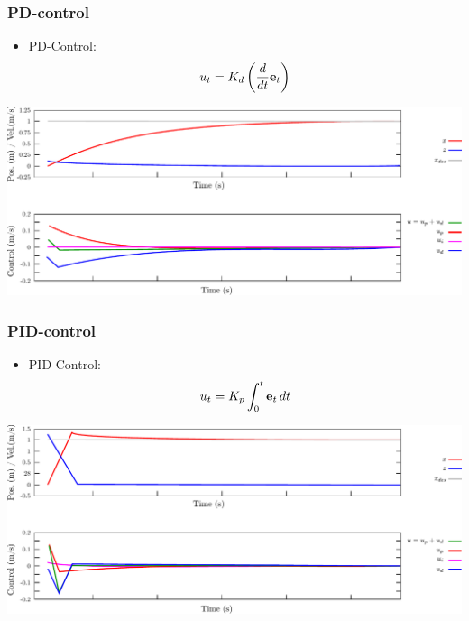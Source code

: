 \begin{frame}
    \frametitle{PD-control}
    
    \begin{itemize}
        \item PD-Control:
        \begin{equation*}
            u_{t} = K_{d} \left( \frac{d}{d t} \boldsymbol{\mathbf{e}}_{t} \right)
        \end{equation*}
    \end{itemize}
    
    \begin{center}
        \includegraphics[width=0.8\columnwidth]{images/pid_control_position_proportional_derivative.pdf}
    \end{center}
    
\end{frame}


\begin{frame}
    \frametitle{PID-control}
    
    \begin{itemize}
        \item PID-Control:
        \begin{equation*}
            u_{t} = K_{p} \int_{0}^{t} \boldsymbol{\mathbf{e}}_{t} \, dt
        \end{equation*}
    \end{itemize}
    
    \begin{center}
        \includegraphics[width=0.8\columnwidth]{images/pid_control_position_proportional_integral_derivative.pdf}
    \end{center}
    
\end{frame}



